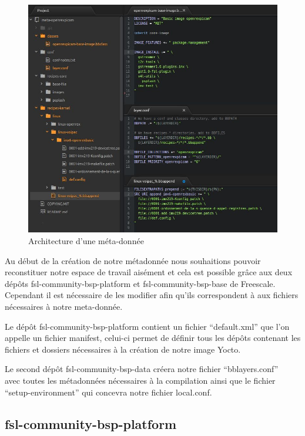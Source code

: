 \begin{figure}[!htb]
    \centering
    \includegraphics[trim={0cm 0cm 0cm 0cm},clip,scale=0.31]{Figures/architecture.png}
    \decoRule
    \caption{Architecture d'une méta-donnée} \label{fig:architecture}
\end{figure} 

Au début de la création de notre métadonnée nous souhaitions pouvoir reconstituer notre
espace de travail aisément et cela est possible grâce aux deux dépôts
fsl-community-bsp-platform et fsl-community-bsp-base de Freescale. Cependant il est
nécessaire de les modifier afin qu’ils correspondent à aux fichiers nécessaires à notre
meta-donnée. \medskip 

Le dépôt fsl-community-bsp-platform contient un fichier “default.xml” que l’on appelle un
fichier manifest, celui-ci permet de définir tous les dépôts contenant les fichiers et dossiers
nécessaires à la création de notre image Yocto. \medskip 

Le second dépôt fsl-community-bsp-data créera notre fichier “bblayers.conf” \\
avec toutes les métadonnées nécessaires à la compilation ainsi que le fichier \\
“setup-environment” qui concevra notre fichier local.conf.

\subsection{fsl-community-bsp-platform}

